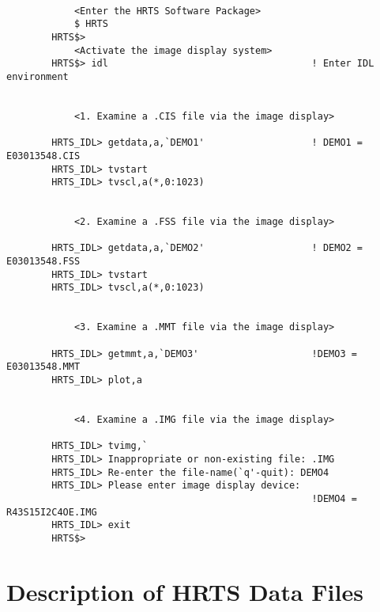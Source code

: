 \begin{verbatim}

            <Enter the HRTS Software Package>
            $ HRTS
        HRTS$>                       
            <Activate the image display system>
        HRTS$> idl                                    ! Enter IDL environment


            <1. Examine a .CIS file via the image display>

        HRTS_IDL> getdata,a,`DEMO1'                   ! DEMO1 = E03013548.CIS
        HRTS_IDL> tvstart
        HRTS_IDL> tvscl,a(*,0:1023)


            <2. Examine a .FSS file via the image display>

        HRTS_IDL> getdata,a,`DEMO2'                   ! DEMO2 = E03013548.FSS
        HRTS_IDL> tvstart
        HRTS_IDL> tvscl,a(*,0:1023)


            <3. Examine a .MMT file via the image display>

        HRTS_IDL> getmmt,a,`DEMO3'                    !DEMO3 = E03013548.MMT
        HRTS_IDL> plot,a


            <4. Examine a .IMG file via the image display>

        HRTS_IDL> tvimg,`                   
        HRTS_IDL> Inappropriate or non-existing file: .IMG
        HRTS_IDL> Re-enter the file-name(`q'-quit): DEMO4
        HRTS_IDL> Please enter image display device:
                                                      !DEMO4 = R43S15I2C4OE.IMG
        HRTS_IDL> exit
        HRTS$>

\end{verbatim}

\newpage

\section{Description of HRTS Data Files} 

